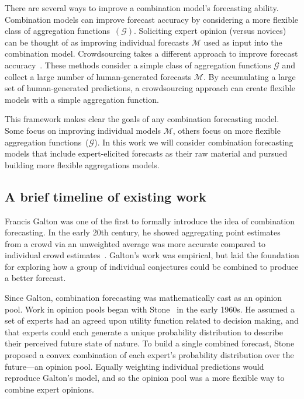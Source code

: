 \documentclass[preprint,authoryear,nonatbib]{elsarticle}
\begin{document}
There are several ways to improve a combination model's forecasting ability.
Combination models can improve forecast accuracy by considering a more flexible class of aggregation functions~$(\mathcal{G})$.
Soliciting expert opinion (versus novices) can be thought of as improving individual forecasts $\mathcal{M}$ used as input into the combination model.
Crowdsourcing takes a different approach to improve forecast accuracy~\parencite{howe2006rise,brabham2013crowdsourcing,abernethy2011collaborative,forlines2014crowdsourcing,moran2016epidemic}. 
These methods consider a simple class of aggregation functions $\mathcal{G}$ and collect a large number of human-generated forecasts $\mathcal{M}$.
By accumulating a large set of human-generated predictions, a crowdsourcing approach can create flexible models with a simple aggregation function.

This framework makes clear the goals of any combination forecasting model.
Some focus on improving individual models $\mathcal{M}$, others focus on more flexible aggregation functions~($\mathcal{G}$).
In this work we will consider combination forecasting models that include expert-elicited forecasts as their raw material and pursued building more flexible aggregations models.

\subsection{A brief timeline of existing work}

Francis Galton was one of the first to formally introduce the idea of combination forecasting. 
In the early 20th century, he showed aggregating point estimates from a crowd via an unweighted average was more accurate compared to individual crowd estimates~\parencite{galton1907vox}.
Galton's work was empirical, but laid the foundation for exploring how a group of individual conjectures could be combined to produce a better forecast. 

Since Galton, combination forecasting was mathematically cast as an opinion pool.
Work in opinion pools began with Stone~\parencite{stone1961opinion} in the early 1960s.
He assumed a set of experts had an agreed upon utility function related to decision making, and that experts could each generate a unique probability distribution to describe their perceived future state of nature.
To build a single combined forecast, Stone proposed a convex combination of each expert's probability distribution over the future---an opinion pool.
Equally weighting individual predictions would reproduce Galton's model, and so the opinion pool was a more flexible way to combine expert opinions.
\end{document}
